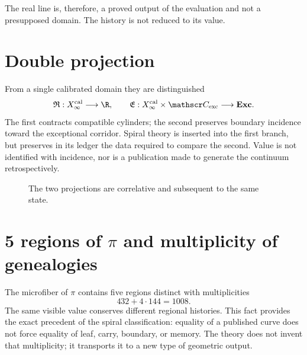 The real line is, therefore, a proved output of the evaluation and not a
presupposed domain. The history is not reduced to its value.

\section{Double projection}

From a single calibrated domain they are distinguished
\[
 \mathfrak R:X_\infty^{\mathrm{cal}}\longrightarrow\R,
 \qquad
 \mathfrak E:X_\infty^{\mathrm{cal}}\times\mathscr C_{\mathrm{exc}}
 \longrightarrow\mathbf{Exc}.
\]
The first contracts compatible cylinders; the second preserves boundary
incidence toward the exceptional corridor. Spiral theory is inserted into the
first branch, but preserves in its ledger the data required to compare
the second. Value is not identified with incidence, nor is a publication made to
generate the continuum retrospectively.

\begin{figure}[htbp]
\centering
{}
\caption{The two projections are correlative and subsequent to the same state.}
\label{espiral:fig:doble-proyeccion-espiral}
\end{figure}

\section{5 regions of \texorpdfstring{\(\pi\)}{pi} and multiplicity of genealogies}

The microfiber of \(\pi\) contains five regions distinct with
multiplicities
\[
 432+4\cdot144=1008.
\]
The same visible value conserves different regional histories. This fact
provides the exact precedent of the spiral classification: equality of
a published curve does not force equality of leaf, carry, boundary, or
memory. The theory does not invent that multiplicity; it transports it to a new
type of geometric output.

